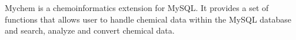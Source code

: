 Mychem is a chemoinformatics extension for MySQL. It provides a set of functions that allows user to handle chemical data within the MySQL database and search, analyze and convert chemical data.